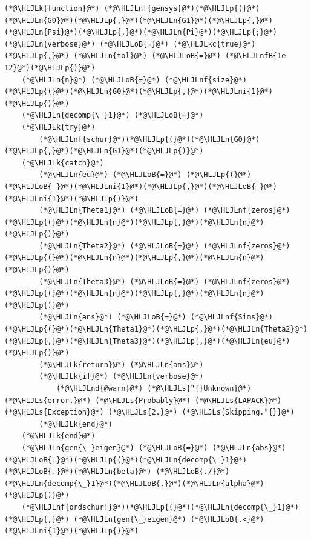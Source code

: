 \documentclass[12pt,a4paper]{article}
\newcommand{\HLJLk}[1]{\textcolor[RGB]{148,91,176}{\textbf{#1}}}
\newcommand{\HLJLkc}[1]{\textcolor[RGB]{59,151,46}{\textit{#1}}}
\newcommand{\HLJLn}[1]{#1}
\newcommand{\HLJLnd}[1]{\textcolor[RGB]{214,102,97}{#1}}
\newcommand{\HLJLnf}[1]{\textcolor[RGB]{66,102,213}{#1}}
\newcommand{\HLJLs}[1]{\textcolor[RGB]{201,61,57}{#1}}
\newcommand{\HLJLnfB}[1]{\textcolor[RGB]{59,151,46}{#1}}
\newcommand{\HLJLni}[1]{\textcolor[RGB]{59,151,46}{#1}}
\newcommand{\HLJLoB}[1]{\textcolor[RGB]{102,102,102}{\textbf{#1}}}
\newcommand{\HLJLp}[1]{#1}
\begin{document}
\begin{lstlisting}
(*@\HLJLk{function}@*) (*@\HLJLnf{gensys}@*)(*@\HLJLp{(}@*)(*@\HLJLn{G0}@*)(*@\HLJLp{,}@*)(*@\HLJLn{G1}@*)(*@\HLJLp{,}@*)(*@\HLJLn{Psi}@*)(*@\HLJLp{,}@*)(*@\HLJLn{Pi}@*)(*@\HLJLp{;}@*)(*@\HLJLn{verbose}@*) (*@\HLJLoB{=}@*) (*@\HLJLkc{true}@*)(*@\HLJLp{,}@*) (*@\HLJLn{tol}@*) (*@\HLJLoB{=}@*) (*@\HLJLnfB{1e-12}@*)(*@\HLJLp{)}@*)
    (*@\HLJLn{n}@*) (*@\HLJLoB{=}@*) (*@\HLJLnf{size}@*)(*@\HLJLp{(}@*)(*@\HLJLn{G0}@*)(*@\HLJLp{,}@*)(*@\HLJLni{1}@*)(*@\HLJLp{)}@*)
    (*@\HLJLn{decomp{\_}1}@*) (*@\HLJLoB{=}@*)
    (*@\HLJLk{try}@*)
        (*@\HLJLnf{schur}@*)(*@\HLJLp{(}@*)(*@\HLJLn{G0}@*)(*@\HLJLp{,}@*)(*@\HLJLn{G1}@*)(*@\HLJLp{)}@*)
    (*@\HLJLk{catch}@*)
        (*@\HLJLn{eu}@*) (*@\HLJLoB{=}@*) (*@\HLJLp{(}@*)(*@\HLJLoB{-}@*)(*@\HLJLni{1}@*)(*@\HLJLp{,}@*)(*@\HLJLoB{-}@*)(*@\HLJLni{1}@*)(*@\HLJLp{)}@*)
        (*@\HLJLn{Theta1}@*) (*@\HLJLoB{=}@*) (*@\HLJLnf{zeros}@*)(*@\HLJLp{(}@*)(*@\HLJLn{n}@*)(*@\HLJLp{,}@*)(*@\HLJLn{n}@*)(*@\HLJLp{)}@*)
        (*@\HLJLn{Theta2}@*) (*@\HLJLoB{=}@*) (*@\HLJLnf{zeros}@*)(*@\HLJLp{(}@*)(*@\HLJLn{n}@*)(*@\HLJLp{,}@*)(*@\HLJLn{n}@*)(*@\HLJLp{)}@*)
        (*@\HLJLn{Theta3}@*) (*@\HLJLoB{=}@*) (*@\HLJLnf{zeros}@*)(*@\HLJLp{(}@*)(*@\HLJLn{n}@*)(*@\HLJLp{,}@*)(*@\HLJLn{n}@*)(*@\HLJLp{)}@*)
        (*@\HLJLn{ans}@*) (*@\HLJLoB{=}@*) (*@\HLJLnf{Sims}@*)(*@\HLJLp{(}@*)(*@\HLJLn{Theta1}@*)(*@\HLJLp{,}@*)(*@\HLJLn{Theta2}@*)(*@\HLJLp{,}@*)(*@\HLJLn{Theta3}@*)(*@\HLJLp{,}@*)(*@\HLJLn{eu}@*)(*@\HLJLp{)}@*)
        (*@\HLJLk{return}@*) (*@\HLJLn{ans}@*)
        (*@\HLJLk{if}@*) (*@\HLJLn{verbose}@*)
            (*@\HLJLnd{@warn}@*) (*@\HLJLs{"{}Unknown}@*) (*@\HLJLs{error.}@*) (*@\HLJLs{Probably}@*) (*@\HLJLs{LAPACK}@*) (*@\HLJLs{Exception}@*) (*@\HLJLs{2.}@*) (*@\HLJLs{Skipping."{}}@*)
        (*@\HLJLk{end}@*)
    (*@\HLJLk{end}@*)
    (*@\HLJLn{gen{\_}eigen}@*) (*@\HLJLoB{=}@*) (*@\HLJLn{abs}@*)(*@\HLJLoB{.}@*)(*@\HLJLp{(}@*)(*@\HLJLn{decomp{\_}1}@*)(*@\HLJLoB{.}@*)(*@\HLJLn{beta}@*) (*@\HLJLoB{./}@*) (*@\HLJLn{decomp{\_}1}@*)(*@\HLJLoB{.}@*)(*@\HLJLn{alpha}@*)(*@\HLJLp{)}@*)
    (*@\HLJLnf{ordschur!}@*)(*@\HLJLp{(}@*)(*@\HLJLn{decomp{\_}1}@*)(*@\HLJLp{,}@*) (*@\HLJLn{gen{\_}eigen}@*) (*@\HLJLoB{.<}@*) (*@\HLJLni{1}@*)(*@\HLJLp{)}@*)


\end{lstlisting}
\end{document}
